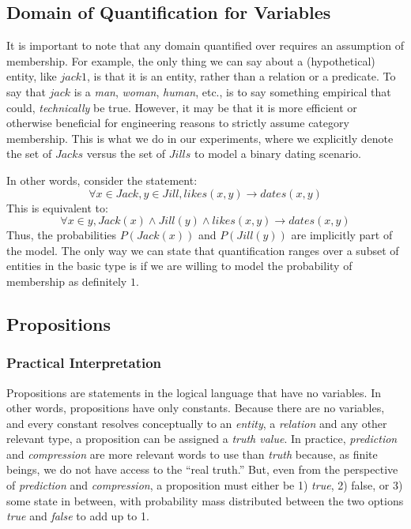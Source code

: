 \documentclass[12pt]{article}
\begin{document}
\subsection{Domain of Quantification for Variables}
It is important to note that any domain quantified over requires an assumption of membership.
For example, the only thing we can say about a (hypothetical) entity, like \( jack1 \), is that it is an entity, rather than a relation or a predicate.
To say that \( jack \) is a \emph{man}, \emph{woman}, \emph{human}, etc., is to say something empirical that could, \emph{technically} be true.
However, it may be that it is more efficient or otherwise beneficial for engineering reasons to strictly assume category membership.
This is what we do in our experiments, where we explicitly denote the set of \( Jacks \) versus the set of \( Jills \) to model a binary dating scenario.

In other words, consider the statement:
\[ \forall x \in Jack, y \in Jill, likes(x, y) \rightarrow dates(x, y) \]
This is equivalent to:
\[\forall x \in  y, Jack(x) \wedge Jill(y) \wedge likes(x, y) \rightarrow dates(x, y) \]
Thus, the probabilities $P(Jack(x))$ and $P(Jill(y))$ are implicitly part of the model.
The only way we can state that quantification ranges over a subset of entities in the basic type is if we are willing to model the probability of membership as definitely $1$.

\subsection{Propositions}
\subsubsection{Practical Interpretation}
Propositions are statements in the logical language that have no variables. In other words, propositions have only constants.
Because there are no variables, and every constant resolves conceptually to an {\em entity}, a {\em relation} and any other relevant type, a proposition can be assigned a {\em truth value}.
In practice, {\em prediction} and {\em compression} are more relevant words to use than {\em truth} because, as finite beings, we do not have access to the ``real truth.''
But, even from the perspective of {\em prediction} and {\em compression}, a proposition must either be 1) {\em true}, 2) false, or 3) some state in between, with probability mass distributed between the two options {\em true} and {\em false} to add up to 1.
\end{document}

